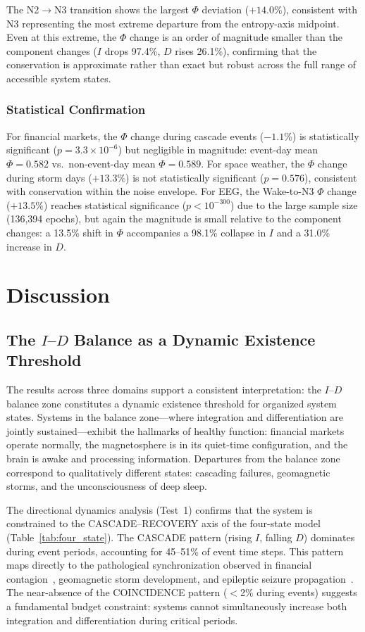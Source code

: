 \documentclass[12pt,a4paper]{article}
\begin{document}
The N2$\to$N3 transition shows the largest $\Phi$ deviation ($+14.0\%$), consistent with N3 representing the most extreme departure from the entropy-axis midpoint. Even at this extreme, the $\Phi$ change is an order of magnitude smaller than the component changes ($I$ drops 97.4\%, $D$ rises 26.1\%), confirming that the conservation is approximate rather than exact but robust across the full range of accessible system states.

\subsubsection{Statistical Confirmation}

For financial markets, the $\Phi$ change during cascade events ($-1.1\%$) is statistically significant ($p = 3.3 \times 10^{-6}$) but negligible in magnitude: event-day mean $\Phi = 0.582$ vs.\ non-event-day mean $\Phi = 0.589$. For space weather, the $\Phi$ change during storm days ($+13.3\%$) is not statistically significant ($p = 0.576$), consistent with conservation within the noise envelope. For EEG, the Wake-to-N3 $\Phi$ change ($+13.5\%$) reaches statistical significance ($p < 10^{-300}$) due to the large sample size (136,394 epochs), but again the magnitude is small relative to the component changes: a 13.5\% shift in $\Phi$ accompanies a 98.1\% collapse in $I$ and a 31.0\% increase in $D$.


\section{Discussion}

\subsection{The $I$--$D$ Balance as a Dynamic Existence Threshold}

The results across three domains support a consistent interpretation: the $I$--$D$ balance zone constitutes a dynamic existence threshold for organized system states. Systems in the balance zone---where integration and differentiation are jointly sustained---exhibit the hallmarks of healthy function: financial markets operate normally, the magnetosphere is in its quiet-time configuration, and the brain is awake and processing information. Departures from the balance zone correspond to qualitatively different states: cascading failures, geomagnetic storms, and the unconsciousness of deep sleep.

The directional dynamics analysis (Test~1) confirms that the system is constrained to the CASCADE--RECOVERY axis of the four-state model (Table~\ref{tab:four_state}). The CASCADE pattern (rising $I$, falling $D$) dominates during event periods, accounting for 45--51\% of event time steps. This pattern maps directly to the pathological synchronization observed in financial contagion~\cite{forbes2002}, geomagnetic storm development, and epileptic seizure propagation~\cite{lehnertz2009}. The near-absence of the COINCIDENCE pattern ($<$2\% during events) suggests a fundamental budget constraint: systems cannot simultaneously increase both integration and differentiation during critical periods.
\end{document}
